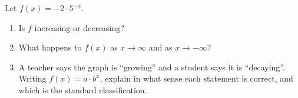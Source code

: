 Let $f(x)=-2\cdot5^{-x}$.
\begin{enumerate}
\item[(a)] Is $f$ increasing or decreasing?
\item[(b)] What happens to $f(x)$ as $x\to\infty$ and as $x\to-\infty$?
\item[(c)] A teacher says the graph is ``growing'' and a student says it is ``decaying''. Writing $f(x)=a\cdot b^x$, explain in what sense each statement is correct, and which is the standard classification.
\end{enumerate}
